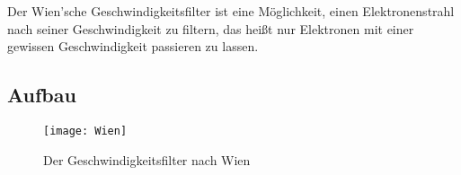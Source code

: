 




%
%	





Der Wien'sche Geschwindigkeitsfilter ist eine Möglichkeit, einen Elektronenstrahl nach seiner Geschwindigkeit zu filtern, das heißt nur Elektronen mit einer gewissen Geschwindigkeit passieren zu lassen.

\subsection{Aufbau}

\begin{figure}[h!]
	\centering
	\vspace*{-10pt}
	\texttt{[image: Wien]}
	\caption{Der Geschwindigkeitsfilter nach Wien}
	\label{fig:Wien}
\end{figure}

